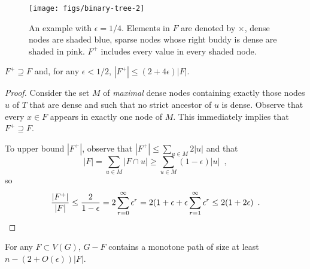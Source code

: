 \documentclass{patmorin}
\begin{document}
\begin{figure}
  \begin{center}
	  \texttt{[image: figs/binary-tree-2]}
  \end{center}
  \caption{An example with $\epsilon=1/4$.  Elements in $F$ are denoted by $\times$, dense nodes are shaded blue, sparse nodes whose right buddy is dense are shaded in pink. $F^+$ includes every value in every shaded node.}
\end{figure}

\begin{clm}
  $F^+\supseteq F$ and, for any $\epsilon < 1/2$, $|F^+|\le (2+4\epsilon)|F|$.
\end{clm}

\begin{proof}
  Consider the set $M$ of \emph{maximal} dense nodes containing exactly
  those nodes $u$ of $T$ that are dense and such that no strict ancestor
  of $u$ is dense.  Observe that every $x\in F$ appears in exactly one
  node of $M$.  This immediately implies that $F^+\supseteq F$.

  To upper bound $|F^+|$, observe that $|F^+| \le \sum_{u\in M} 2|u|$
  and that 
  \[ 
     |F| = \sum_{u\in M} |F\cap u| \ge \sum_{u\in M} (1-\epsilon)|u| \enspace , 
  \]
	so
  \[
    \frac{|F^+|}{|F|} 
      \le \frac{2}{1-\epsilon} 
	= 2\sum_{r=0}^\infty\epsilon^r 
	= 2(1+\epsilon + \epsilon\sum_{r=1}^\infty \epsilon^r 
	\le 2(1+2\epsilon) \enspace . \qedhere
  \]
\end{proof}

\begin{clm}
  For any $F\subset V(G)$, $G-F$ contains a monotone path 
  of size at least $n - (2+O(\epsilon))|F|$.
\end{clm}
\end{document}
